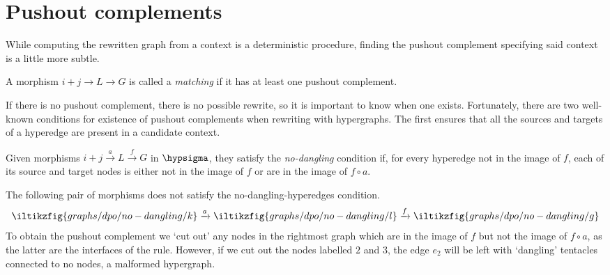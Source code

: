 \section{Pushout complements}

While computing the rewritten graph from a context is a deterministic procedure,
finding the pushout complement specifying said context
is a little more subtle.

\begin{definition}
    A morphism \(i+j \to L \to G\) is called a \emph{matching} if it
    has at least one pushout complement.
\end{definition}

If there is no pushout complement, there is no possible rewrite, so it is
important to know when one exists.
Fortunately, there are two well-known conditions for existence of pushout
complements when rewriting with hypergraphs.
The first ensures that all the sources and targets of a hyperedge are present
in a candidate context.

\begin{definition}
    Given morphisms \(i+j \xrightarrow{a} L \xrightarrow{f} G\) in
    \(\hypsigma\), they satisfy the \emph{no-dangling} condition if, for every
    hyperedge not in
    the image of \(f\), each of its source and target nodes is either not in
    the image of \(f\) or are in the image of \(f \circ a\).
\end{definition}

\begin{example}
    The following pair of morphisms does not satisfy the no-dangling-hyperedges
    condition.
    \[
        \iltikzfig{graphs/dpo/no-dangling/k}
        \xrightarrow{a}
        \iltikzfig{graphs/dpo/no-dangling/l}
        \xrightarrow{f}
        \iltikzfig{graphs/dpo/no-dangling/g}
    \]
    To obtain the pushout complement we `cut out' any nodes in the
    rightmost graph which are in the image of \(f\) but not the image of
    \(f \circ a\), as the latter are the interfaces of the rule.
    However, if we cut out the nodes labelled \(2\) and \(3\), the edge
    \(e_2\) will be left with `dangling' tentacles connected to no nodes, a
    malformed hypergraph.
    \begin{center}
    \end{center}
\end{example}


